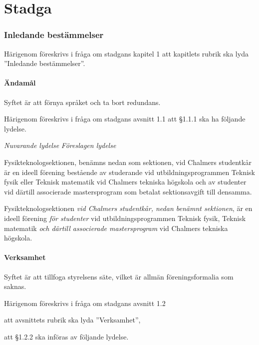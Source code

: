\documentclass{article}
\newenvironment{lydelse}
    {\begin{paracol}{2}%
        \emph{Nuvarande lydelse}%
        \switchcolumn%
        \emph{Föreslagen lydelse}%
    \end{paracol}%
    \begin{enumerate}[label=\thesubsection.\arabic*]%
    \begin{paracol}{2}%
    }{\end{paracol}\end{enumerate}}
\begin{document}
\tableofcontents
\clearpage


\part{Stadga}
\section{Inledande bestämmelser}
Härigenom föreskrivs i fråga om stadgans kapitel 1 att kapitlets rubrik ska lyda
''Inledande bestämmelser''.


\subsection{Ändamål}
Syftet är att förnya språket och ta bort redundans.

Härigenom föreskrivs i fråga om stadgans avsnitt 1.1 att \S 1.1.1 ska ha
följande lydelse.

\begin{lydelse}
    \item Fysikteknologsektionen, benämns nedan som sektionen, vid Chalmers studentkår är en ideell förening bestående av studerande vid utbildningsprogrammen Teknisk fysik eller Teknisk matematik vid Chalmers tekniska högskola och av studenter vid därtill associerade mastersprogram som betalat sektionsavgift till densamma.
  \switchcolumn
    \item Fysikteknologsektionen \emph{vid Chalmers studentkår, nedan benämnt
      sektionen}, är en ideell förening \emph{för studenter} vid
      utbildningsprogrammen Teknisk fysik, Teknisk matematik \emph{och därtill
      associerade mastersprogram} vid Chalmers tekniska högskola.
\end{lydelse}

\subsection{Verksamhet}
Syftet är att tillfoga styrelsens säte, vilket är allmän föreningsformalia som
saknas.

Härigenom föreskrivs i fråga om stadgans avsnitt 1.2
\begin{dels}
    \item att avsnittets rubrik ska lyda ''Verksamhet'',
    \item att \S 1.2.2 ska införas av följande lydelse.
\end{dels}
\end{document}

